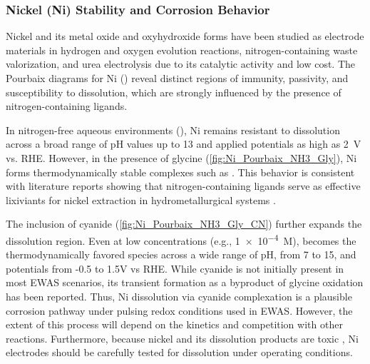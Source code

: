 \documentclass[journal=jacsat,manuscript=article]{achemso}
\begin{document}
\subsubsection{Nickel (Ni) Stability and Corrosion Behavior}
Nickel and its metal oxide and oxyhydroxide forms have been studied as electrode materials in hydrogen and oxygen evolution reactions, nitrogen-containing waste valorization, and urea electrolysis \cite{Wang2014InCatalysts, Yan2012NickelElectro-oxidation, Vedharathinam2012UnderstandingMedium, Coyle2025NovelCarbon, JafariElectrochemicalProduction, LiraGarciaBarros2025ImpactElectrolyzer, Wang2020Non-precious-metalAdvances} due to its catalytic activity and low cost. The Pourbaix diagrams for Ni () reveal distinct regions of immunity, passivity, and susceptibility to dissolution, which are strongly influenced by the presence of nitrogen-containing ligands. 

In nitrogen-free aqueous environments (), Ni remains resistant to dissolution across a broad range of pH values up to 13 and applied potentials as high as 2~V vs. RHE. However, in the presence of glycine (\ref{fig:Ni_Pourbaix_NH3_Gly}), Ni forms thermodynamically stable complexes such as \ce{[Ni(Gly)_3]^{-}}. This behavior is consistent with literature reports showing that nitrogen-containing ligands serve as effective lixiviants for nickel extraction in hydrometallurgical systems \cite{Meng1996PrinciplesReview, Yao2021SelectivePhosphide, Ma2021ALeaching}. 

The inclusion of cyanide (\ref{fig:Ni_Pourbaix_NH3_Gly_CN}) further expands the dissolution region. Even at low concentrations (e.g., \num{1e-4}~M),  becomes the thermodynamically favored species across a wide range of pH, from 7 to 15, and potentials from -0.5 to 1.5V vs RHE. While cyanide is not initially present in most EWAS scenarios, its transient formation as a byproduct of glycine oxidation has been reported. Thus, Ni dissolution via cyanide complexation is a plausible corrosion pathway under pulsing redox conditions used in EWAS. However, the extent of this process will depend on the kinetics and competition with other reactions. Furthermore, because nickel and its dissolution products are toxic \cite{Bhattacharya2009CyanideTreatment}, Ni electrodes should be carefully tested for dissolution under operating conditions.
\end{document}
